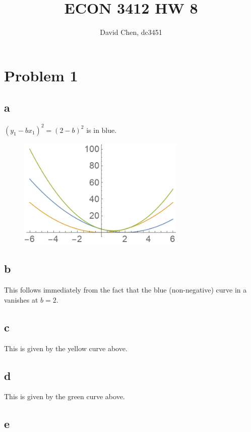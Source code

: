 \documentclass[12pt,letterpaper]{article}
\title{ECON 3412 HW 8}
\author{David Chen, dc3451}
\theoremstyle{definition}
\begin{document}
\maketitle

\section*{Problem 1}
\subsection*{a}

$(y_{1} - bx_{1})^{2} = (2 - b)^{2}$ is in blue.

\begin{figure}[H]
  \centering
  \includegraphics[width=8cm]{plot1.png}
\end{figure}

\subsection*{b}

This follows immediately from the fact that the blue (non-negative) curve in a vanishes at $b = 2$.

\subsection*{c}

This is given by the yellow curve above.

\subsection*{d}

This is given by the green curve above.

\subsection*{e}
\end{document}
